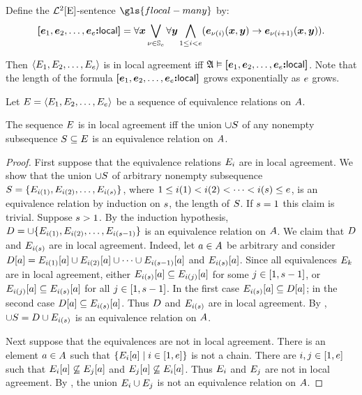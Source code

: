 \begin{definition}
Define the $\mathcal{L}^{2}[{\mathrm{E}}]$-sentence $\gls{flocal-many}$ by:
\[
  {\bm{[}\bm{e}_{1},\bm{e}_{2},\dots,\bm{e}_{e}\mathord{\bm{:}}\mathsf{local}\bm{]}} = \forall\bm{x}
  \bigvee_{\nu \in \mathbb{S}_{e}}
  \forall\bm{y} \bigwedge_{1 \leq i < e}
  (\bm{e}_{\nu(i)}(\bm{x},\bm{y}) \rightarrow \bm{e}_{\nu(i+1)}(\bm{x},\bm{y})).
\]
\end{definition}
Then $\left\langle E_{1},E_{2},\dots,E_{e} \right\rangle$ is in local agreement iff
$\mathfrak{A} \vDash {\bm{[}\bm{e}_{1},\bm{e}_{2},\dots,\bm{e}_{e}\mathord{\bm{:}}\mathsf{local}\bm{]}}$.
Note that the length of the formula ${\bm{[}\bm{e}_{1},\bm{e}_{2},\dots,\bm{e}_{e}\mathord{\bm{:}}\mathsf{local}\bm{]}}$ grows
exponentially as $e$ grows.

Let $E = \left\langle E_{1},E_{2},\dots,E_{e} \right\rangle$ be a sequence of
equivalence relations on $A$.
\begin{theorem}\label{thm:local}
The sequence $E$ is in local agreement iff
the union $\cup S$ of any nonempty subsequence $S \subseteq E$
is an equivalence relation on $A$.
\end{theorem}
\begin{proof}
First suppose that the equivalence relations $E_{i}$ are in local agreement.
We show that the union $\cup S$ of arbitrary nonempty subsequence 
$S = \{E_{i(1)}, E_{i(2)}, \dots, E_{i(s)}\}$,
where $1 \leq i(1) < i(2) < \dots < i(s) \leq e$, is an
equivalence relation by induction on $s$, the length of $S$.
If $s = 1$ this claim is trivial.
Suppose $s > 1$.
By the induction hypothesis, $D = \cup \{E_{i(1)},
E_{i(2)}, \dots, E_{i(s-1)}\}$ is an equivalence relation on
$A$.
We claim that $D$ and $E_{i(s)}$ are in local agreement.
Indeed, let $a \in A$ be arbitrary and consider
$D[a] = E_{i(1)}[a] \cup E_{i(2)}[a] \cup \dots \cup
E_{i(s - 1)}[a]$ and $E_{i(s)}[a]$.
Since all equivalences $E_{k}$
are in local agreement, either
$E_{i(s)}[a] \subseteq E_{i(j)}[a]$ 
for some $j \in [1, s-1]$,
or $E_{i(j)}[a] \subseteq E_{i(s)}[a]$
for all $j \in [1, s-1]$.
In the first case $E_{i(s)}[a] \subseteq D[a]$;
in the second case $D[a] \subseteq E_{i(s)}[a]$.
Thus $D$ and $E_{i(s)}$ are in local agreement.
By , $\cup S = D \cup E_{i(s)}$ is an
equivalence relation on $A$.

Next suppose that the equivalences are not in local agreement.
There is an element $a \in A$ such that
$\left\{E_{i}[a]\mathrel{}\middle|\mathrel{}i \in [1, e]\right\}$ is not a chain. 
There are $i, j \in [1, e]$ such that
$E_{i}[a] \not\subseteq E_{j}[a]$ and
$E_{j}[a] \not\subseteq E_{i}[a]$.
Thus $E_{i}$ and $E_{j}$ are not in local agreement.
By , the union $E_{i} \cup E_{j}$ is not an
equivalence relation on $A$.
\end{proof}

